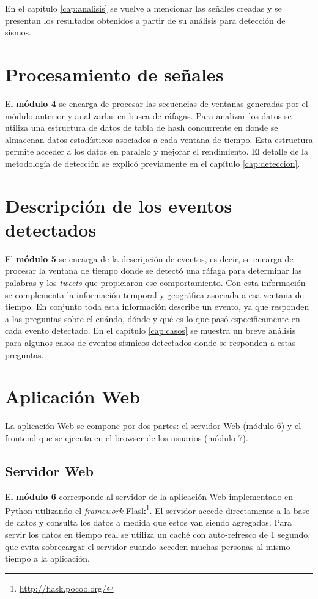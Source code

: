 En el capítulo \ref{cap:analisis} se vuelve a mencionar las señales creadas y se presentan los resultados obtenidos a partir de su análisis para detección de sismos.

\section{Procesamiento de señales}

El \textbf{módulo 4} se encarga de procesar las secuencias de ventanas generadas por el módulo anterior y analizarlas en busca de ráfagas.  
%
Para analizar los datos se utiliza una estructura de datos de tabla de hash concurrente en donde se almacenan datos estadísticos asociados a cada ventana de tiempo. Esta estructura permite acceder a los datos en paralelo y mejorar el rendimiento.
%
El detalle de la metodología de detección se explicó previamente en el capítulo \ref{cap:deteccion}.

\section{Descripción de los eventos detectados}

El \textbf{módulo 5} se encarga de la descripción de eventos, es decir, se encarga de procesar la ventana de tiempo donde se detectó una ráfaga para determinar las palabras y los \textit{tweets} que propiciaron ese comportamiento.
%
Con esta información se complementa la información temporal y geográfica asociada a esa ventana de tiempo.
%
En conjunto toda esta información describe un evento, ya que responden a las preguntas sobre el cuándo, dónde y qué es lo que pasó específicamente en cada evento detectado.
%
En el capítulo \ref{cap:casos} se muestra un breve análisis para algunos casos de eventos sísmicos detectados  donde se responden a estas preguntas.  


\section{Aplicación Web}

La aplicación Web se compone por dos partes: el servidor Web (módulo 6) y el frontend que se ejecuta en el browser de los usuarios (módulo 7). 

\subsection{Servidor Web}
El \textbf{módulo 6} corresponde al servidor de la aplicación Web implementado en Python utilizando el \textit{framework} Flask\footnote{\url{http://flask.pocoo.org/}}. El servidor accede directamente a la base de datos y consulta los datos a medida que estos van siendo agregados. Para servir los datos en tiempo real se utiliza un caché con auto-refresco de 1 segundo, que evita sobrecargar el servidor cuando acceden muchas personas al mismo tiempo a la aplicación. 

